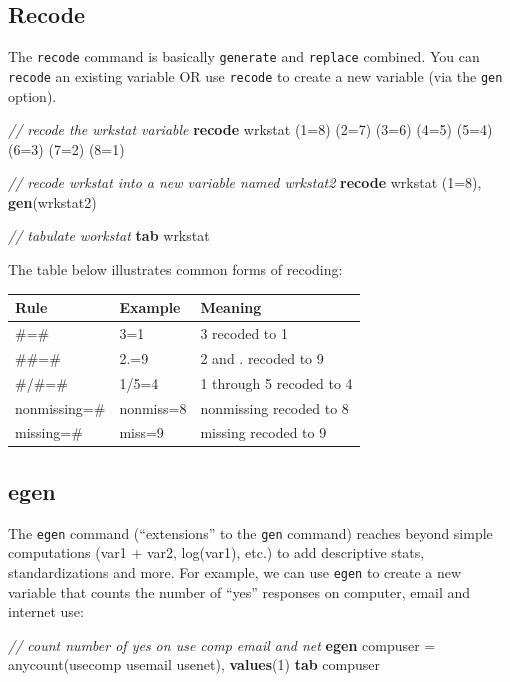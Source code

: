 \documentclass[
]{book}
\newenvironment{Shaded}{\begin{snugshade}}{\end{snugshade}}
\newcommand{\CommentTok}[1]{\textcolor[rgb]{0.56,0.35,0.01}{\textit{#1}}}
\newcommand{\FunctionTok}[1]{\textcolor[rgb]{0.00,0.00,0.00}{#1}}
\newcommand{\KeywordTok}[1]{\textcolor[rgb]{0.13,0.29,0.53}{\textbf{#1}}}
\newcommand{\NormalTok}[1]{#1}
\begin{document}
\hypertarget{recode}{%
\subsection{Recode}\label{recode}}

The \texttt{recode} command is basically \texttt{generate} and \texttt{replace} combined. You can \texttt{recode} an existing variable OR use \texttt{recode} to create a new variable (via the \texttt{gen} option).

\begin{Shaded}
\begin{Highlighting}[]
\CommentTok{// recode the wrkstat variable }
\KeywordTok{recode}\NormalTok{ wrkstat (1=8) (2=7) (3=6) (4=5) (5=4) (6=3) (7=2) (8=1)}

\CommentTok{// recode wrkstat into a new variable named wrkstat2}
\KeywordTok{recode}\NormalTok{ wrkstat (1=8), }\KeywordTok{gen}\NormalTok{(wrkstat2)}

\CommentTok{// tabulate workstat}
\KeywordTok{tab}\NormalTok{ wrkstat}
\end{Highlighting}
\end{Shaded}

The table below illustrates common forms of recoding:

\begin{longtable}[]{@{}lll@{}}
\toprule
Rule & Example & Meaning\tabularnewline
\midrule
\endhead
\#=\# & 3=1 & 3 recoded to 1\tabularnewline
\#\#=\# & 2.=9 & 2 and . recoded to 9\tabularnewline
\#/\#=\# & 1/5=4 & 1 through 5 recoded to 4\tabularnewline
nonmissing=\# & nonmiss=8 & nonmissing recoded to 8\tabularnewline
missing=\# & miss=9 & missing recoded to 9\tabularnewline
\bottomrule
\end{longtable}

\hypertarget{egen}{%
\subsection{egen}\label{egen}}

The \texttt{egen} command (``extensions'' to the \texttt{gen} command) reaches beyond simple computations (var1 + var2, log(var1), etc.) to add descriptive stats, standardizations and more. For example, we can use \texttt{egen} to create a new variable that counts the number of ``yes'' responses on computer, email and internet use:

\begin{Shaded}
\begin{Highlighting}[]
\CommentTok{// count number of yes on use comp email and net }
\KeywordTok{egen}\NormalTok{ compuser = }\FunctionTok{anycount}\NormalTok{(usecomp usemail usenet), }\KeywordTok{values}\NormalTok{(1)}
\KeywordTok{tab}\NormalTok{ compuser}
\end{Highlighting}
\end{Shaded}
\end{document}
